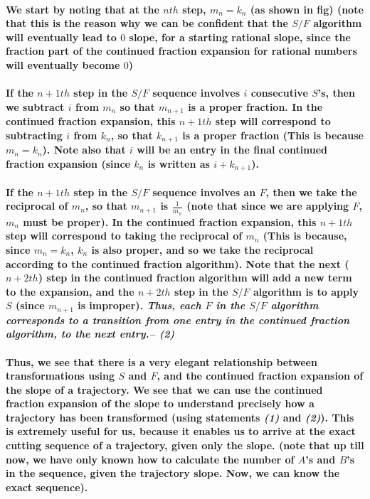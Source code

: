 \documentclass{report}
\begin{document}
\paragraph{We start by noting that at the $nth$ step, $m_n = k_n$ (as shown in fig) (note that this is the reason why we can be confident that the $S/F$ algorithm will eventually lead to $0$ slope, for a starting rational slope, since the fraction part of the continued fraction expansion for rational numbers will eventually become $0$)}

\paragraph{If the $n+1th$ step in the $S/F$ sequence involves $i$ consecutive $S$’s, then we subtract $i$ from $m_n$ so that $m_{n+1}$ is a proper fraction. In the continued fraction expansion, this $n+1th$ step will correspond to subtracting $i$ from $k_n$, so that $k_{n+1}$ is a proper fraction (This is because $m_n = k_n$). Note also that $i$ will be an entry in the final continued fraction expansion (since $k_n$ is written as $i + k_{n+1}$).\\
 }

\paragraph{If the $n+1th$ step in the $S/F$ sequence involves an $F$, then we take the reciprocal of $m_n$, so that $m_{n+1}$ is $\frac{1}{m_n}$ (note that since we are applying $F$, $m_n$ must be proper). In the continued fraction expansion, this $n+1th$ step will correspond to taking the reciprocal of $m_n$ (This is because, since $m_n = k_n$, $k_n$ is also proper, and so we take the reciprocal according to the continued fraction algorithm). Note that the next ($n+2th$) step in the continued fraction algorithm will add a new term to the expansion, and the $n+2th$ step in the $S/F$ algorithm is to apply $S$ (since $m_{n+1}$ is improper). \textit{Thus, each $F$ in the $S/F$ algorithm corresponds to a transition from one entry in the continued fraction algorithm, to the next entry.-- (2)}}

\paragraph{Thus, we see that there is a very elegant relationship between transformations using $S$ and $F$, and the continued fraction expansion of the slope of a trajectory. We see that we can use the continued fraction expansion of the slope to understand precisely how a trajectory has been transformed (using statements \textit{(1)} and \textit{(2)}). This is extremely useful for us, because it enables us to arrive at the exact cutting sequence of a trajectory, given only the slope.  (note that up till now, we have only known how to calculate the number of $A$’s and $B$’s in the sequence, given the trajectory slope. Now, we can know the exact sequence).}
\end{document}
